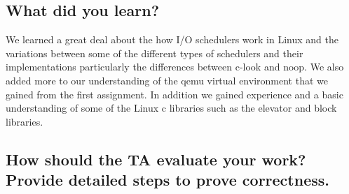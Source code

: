\documentclass[letterpaper, onecolumn, draftclsnofoot, 10pt, compsoc]{IEEEtran}
\begin{document}
    \subsection{What did you learn?}
        \begin{singlespace}
            We learned a great deal about the how I/O schedulers work in Linux and the variations between some of the different types of schedulers and their implementations particularly the differences between c-look and noop. We also added more to our understanding of the qemu virtual environment that we gained from the first assignment. In addition we gained experience and a basic understanding of some of the Linux c libraries such as the elevator and block libraries. 
        \end{singlespace}
    
    \subsection{How should the TA evaluate your work? Provide detailed steps to prove correctness.}
\end{document}

